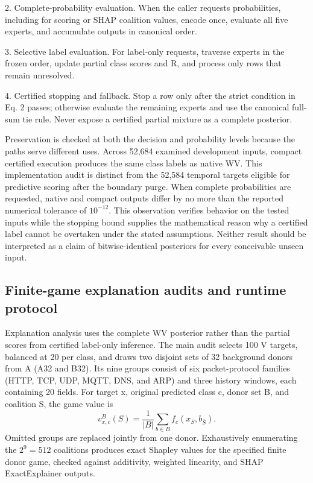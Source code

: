 \documentclass[final,3p,10pt,nopreprintline]{elsarticle}
\begin{document}
2. Complete-probability evaluation. When the caller requests probabilities, including for scoring or SHAP coalition values, encode once, evaluate all five experts, and accumulate outputs in canonical order.

3. Selective label evaluation. For label-only requests, traverse experts in the frozen order, update partial class scores and R, and process only rows that remain unresolved.

4. Certified stopping and fallback. Stop a row only after the strict condition in Eq. 2 passes; otherwise evaluate the remaining experts and use the canonical full-sum tie rule. Never expose a certified partial mixture as a complete posterior.

Preservation is checked at both the decision and probability levels because the paths serve different uses. Across 52,684 examined development inputs, compact certified execution produces the same class labels as native WV. This implementation audit is distinct from the 52,584 temporal targets eligible for predictive scoring after the boundary purge. When complete probabilities are requested, native and compact outputs differ by no more than the reported numerical tolerance of \(10^{-12}\). This observation verifies behavior on the tested inputs while the stopping bound supplies the mathematical reason why a certified label cannot be overtaken under the stated assumptions. Neither result should be interpreted as a claim of bitwise-identical posteriors for every conceivable unseen input.

\subsection{Finite-game explanation audits and runtime protocol}

Explanation analysis uses the complete WV posterior rather than the partial scores from certified label-only inference. The main audit selects 100 V targets, balanced at 20 per class, and draws two disjoint sets of 32 background donors from A (A32 and B32). Its nine groups consist of six packet-protocol families (HTTP, TCP, UDP, MQTT, DNS, and ARP) and three history windows, each containing 20 fields. For target x, original predicted class c, donor set B, and coalition S, the game value is
\begin{equation} v^B_{x,c}(S)=\frac{1}{|B|}\sum_{b\in B}f_c(x_S,b_{\bar S}).\label{eq:game}\end{equation}
Omitted groups are replaced jointly from one donor. Exhaustively enumerating the \(2^9=512\) coalitions produces exact Shapley values for the specified finite donor game, checked against additivity, weighted linearity, and SHAP ExactExplainer outputs.
\end{document}
